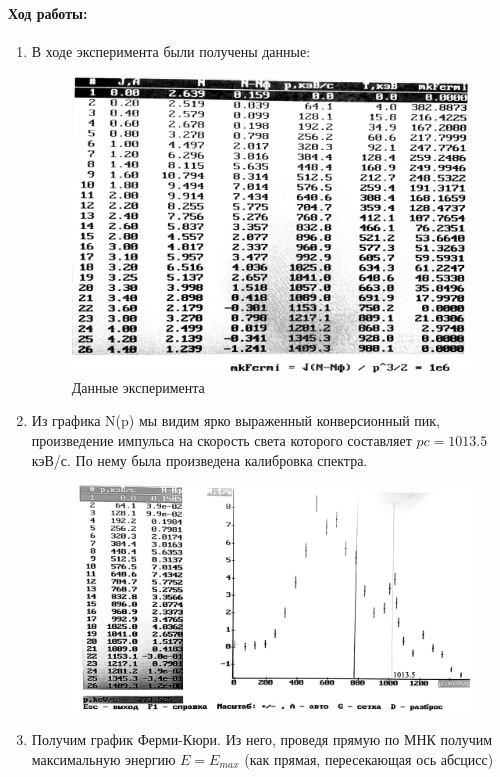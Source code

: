 \documentclass[a4paper,12pt]{article}
\begin{document}
\paragraph{Ход работы:}
\begin{enumerate}
\itemsep0em
\item В ходе эксперимента были получены данные: 
\begin{figure}[h!]
\includegraphics[scale=0.16]{data.png}
\caption{Данные эксперимента} 
\end{figure}
\item Из графика N(p) мы видим ярко выраженный конверсионный пик, произведение импульса на скорость света которого составляет $pc = 1013.5$ кэВ/с. По нему была произведена калибровка спектра.
\begin{figure}[h!]
\centering
\includegraphics[scale=0.13]{pik.png} 
\end{figure}
\item Получим график Ферми-Кюри. Из него, проведя прямую по МНК получим максимальную энергию $E=E_{max}$ (как прямая, пересекающая ось абсцисс)

\end{enumerate}
\end{document}
